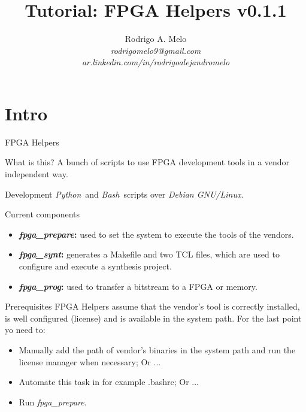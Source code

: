 \documentclass{beamer}
\title[FPGA Helpers]{Tutorial: FPGA Helpers v0.1.1}
\author{
  Rodrigo A. Melo\\
  \textit{rodrigomelo9@gmail.com}\\
  \textit{ar.linkedin.com/in/rodrigoalejandromelo}
}
\newcommand{\python}         {\textit{Python}}
\newcommand{\bash}           {\textit{Bash}}
\newcommand{\debian}         {\textit{Debian GNU/Linux}}
\newcommand{\fpgaprepare}    {\textit{fpga\_prepare}}
\newcommand{\fpgasynt}       {\textit{fpga\_synt}}
\newcommand{\fpgaprog}       {\textit{fpga\_prog}}
\begin{document}
\begin{frame}
  \titlepage
\end{frame}

\section{Intro}

\begin{frame}{FPGA Helpers}
  \begin{exampleblock}{What is this?}
    A bunch of scripts to use FPGA development tools in a vendor independent way.
  \end{exampleblock}
  \begin{block}{Development}
    \python\ and \bash\ scripts over \debian.
  \end{block}
\end{frame}

\begin{frame}{Current components}
  \begin{itemize}
    \item \textbf{\fpgaprepare:} used to set the system to execute the tools of the vendors.
    \item \textbf{\fpgasynt:} generates a Makefile and two TCL files, which are used to
          configure and execute a synthesis project.
    \item \textbf{\fpgaprog:} used to transfer a bitstream to a FPGA or memory.
  \end{itemize}
\end{frame}

\begin{frame}{Prerequisites}
  FPGA Helpers assume that the vendor's tool is correctly installed, is well configured (license)
  and is available in the system path. For the last point yo need to:
  \begin{itemize}
    \item Manually add the path of vendor's binaries in the system path and run the license
          manager when necessary; Or ...
    \item Automate this task in for example .bashrc; Or ...
    \item Run \fpgaprepare.
  \end{itemize}
\end{frame}
\end{document}
